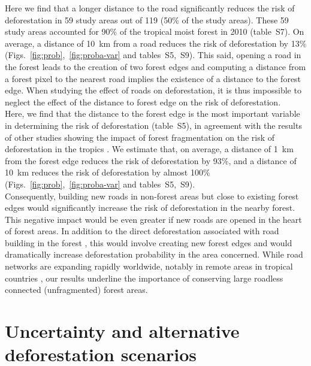 \documentclass[
  12pt,
]{article}
\begin{document}
Here we find that a longer distance to the road significantly reduces the risk of deforestation in 59 study areas out of 119 (50\% of the study areas). These 59 study areas accounted for 90\% of the tropical moist forest in 2010 (table~S7). On average, a distance of 10~km from a road reduces the risk of deforestation by 13\% (Figs.~\ref{fig:prob},~\ref{fig:proba-var} and tables~S5,~S9). This said, opening a road in the forest leads to the creation of two forest edges and computing a distance from a forest pixel to the nearest road implies the existence of a distance to the forest edge. When studying the effect of roads on deforestation, it is thus impossible to neglect the effect of the distance to forest edge on the risk of deforestation.\\

Here, we find that the distance to the forest edge is the most important variable in determining the risk of deforestation (table~S5), in agreement with the results of other studies showing the impact of forest fragmentation on the risk of deforestation in the tropics \citep{Hansen2020}. We estimate that, on average, a distance of 1~km from the forest edge reduces the risk of deforestation by 93\%, and a distance of 10~km reduces the risk of deforestation by almost 100\% (Figs.~\ref{fig:prob},~\ref{fig:proba-var} and tables~S5,~S9).\\

Consequently, building new roads in non-forest areas but close to existing forest edges would significantly increase the risk of deforestation in the nearby forest. This negative impact would be even greater if new roads are opened in the heart of forest areas. In addition to the direct deforestation associated with road building in the forest \citep{Kleinschroth2017}, this would involve creating new forest edges and would dramatically increase deforestation probability in the area concerned. While road networks are expanding rapidly worldwide, notably in remote areas in tropical countries \citep{Laurance2014}, our results underline the importance of conserving large roadless connected (unfragmented) forest areas.

\hypertarget{uncertainty-and-alternative-deforestation-scenarios}{%
\section{Uncertainty and alternative deforestation scenarios}\label{uncertainty-and-alternative-deforestation-scenarios}}
\end{document}
